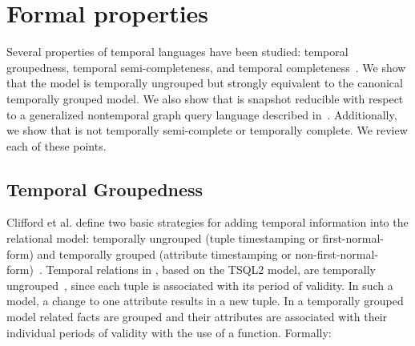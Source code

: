 \section{Formal \tga properties}
\label{sec:formal}

Several properties of temporal languages have been studied: temporal
groupedness, temporal semi-completeness, and temporal
completeness~\cite{Bohlen1995}.  We show that the \tg model is
temporally ungrouped but strongly equivalent to the canonical
temporally grouped model.  We also show that \tga is snapshot
reducible with respect to a generalized nontemporal graph query
language described in~\cite{Wood2012}.  Additionally, we show that
\tga is not temporally semi-complete or temporally complete.  We
review each of these points.

\subsection{Temporal Groupedness}

Clifford et al. define two basic strategies for adding temporal
information into the relational model: temporally ungrouped (tuple
timestamping or first-normal-form) and temporally grouped (attribute
timestamping or non-first-normal-form)~\cite{Clifford1994}.  Temporal
relations in \tra, based on the TSQL2 model, are temporally
ungrouped~\cite{Bohlen1995}, since each tuple is associated with its
period of validity.  In such a model, a change to one attribute
results in a new tuple.  In a temporally grouped model related facts
are grouped and their attributes are associated with their individual
periods of validity with the use of a function.  Formally:

